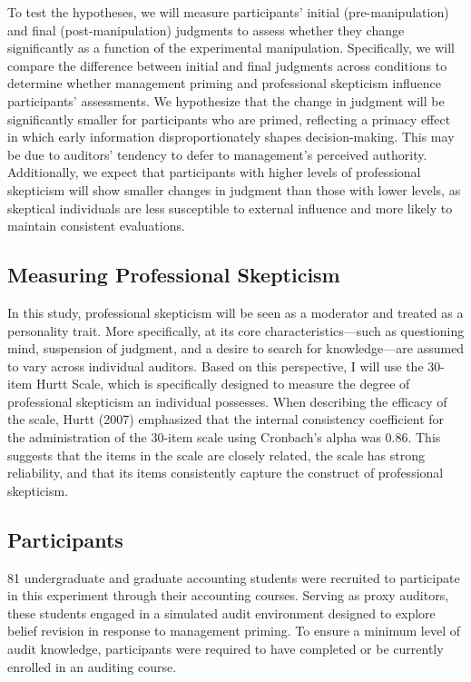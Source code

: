 \documentclass[12pt,english]{article}
\begin{document}
To test the hypotheses, we will measure participants’ initial (pre-manipulation) and final (post-manipulation) judgments to assess whether they change significantly as a function of the experimental manipulation. Specifically, we will compare the difference between initial and final judgments across conditions to determine whether management priming and professional skepticism influence participants’ assessments. We hypothesize that the change in judgment will be significantly smaller for participants who are primed, reflecting a primacy effect in which early information disproportionately shapes decision-making. This may be due to auditors’ tendency to defer to management's perceived authority. Additionally, we expect that participants with higher levels of professional skepticism will show smaller changes in judgment than those with lower levels, as skeptical individuals are less susceptible to external influence and more likely to maintain consistent evaluations.

\subsection{Measuring Professional Skepticism}
In this study, professional skepticism will be seen as a moderator and treated as a personality trait. More specifically, at its core characteristics—such as questioning mind, suspension of judgment, and a desire to search for knowledge—are assumed to vary across individual auditors. Based on this perspective, I will use the 30-item Hurtt Scale, which is specifically designed to measure the degree of professional skepticism an individual possesses. When describing the efficacy of the scale, Hurtt (2007) emphasized that the internal consistency coefficient for the administration of the 30-item scale using Cronbach’s alpha was 0.86. This suggests that the items in the scale are closely related, the scale has strong reliability, and that its items consistently capture the construct of professional skepticism.

\subsection{Participants}
81 undergraduate and graduate accounting students were recruited to participate in this experiment through their accounting courses. Serving as proxy auditors, these students engaged in a simulated audit environment designed to explore belief revision in response to management priming. To ensure a minimum level of audit knowledge, participants were required to have completed or be currently enrolled in an auditing course. 
\end{document}
